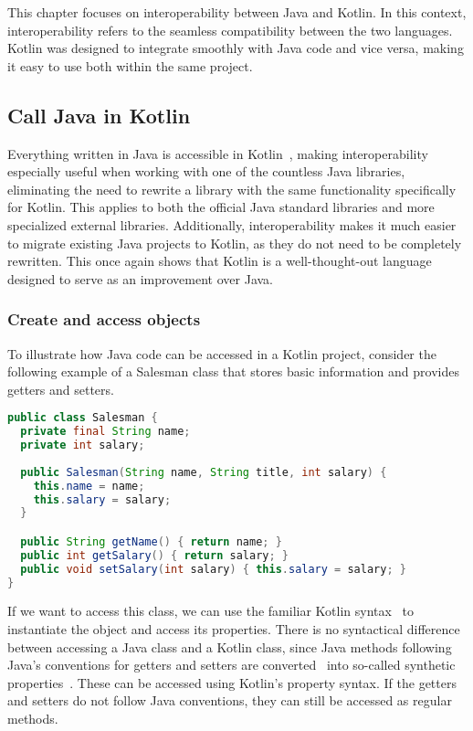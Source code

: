 \documentclass[a4paper,11pt]{article}
\begin{document}
This chapter focuses on interoperability between Java and Kotlin. In this context, interoperability refers to the seamless compatibility between the two languages. Kotlin was designed to integrate smoothly with Java code and vice versa, making it easy to use both within the same project.

\subsection{Call Java in Kotlin}
Everything written in Java is accessible in Kotlin~\cite{interop}, making interoperability especially useful when working with one of the countless Java libraries, eliminating the need to rewrite a library with the same functionality specifically for Kotlin. This applies to both the official Java standard libraries and more specialized external libraries. Additionally, interoperability makes it much easier to migrate existing Java projects to Kotlin, as they do not need to be completely rewritten. This once again shows that Kotlin is a well-thought-out language designed to serve as an improvement over Java.

\subsubsection{Create and access objects}
To illustrate how Java code can be accessed in a Kotlin project, consider the following example of a Salesman class that stores basic information and provides getters and setters.
\begin{lstlisting}[language=Java,title={Example Java class}]
public class Salesman {
  private final String name;
  private int salary;
  
  public Salesman(String name, String title, int salary) {
    this.name = name;
    this.salary = salary;
  }

  public String getName() { return name; }
  public int getSalary() { return salary; }
  public void setSalary(int salary) { this.salary = salary; }
}
\end{lstlisting}

If we want to access this class, we can use the familiar Kotlin syntax~\cite{interop} to instantiate the object and access its properties. There is no syntactical difference between accessing a Java class and a Kotlin class, since Java methods following Java's conventions for getters and setters are converted~\cite{interop-getter-setter} into so-called synthetic properties~\cite{interop-synthetic-property}. These can be accessed using Kotlin’s property syntax. If the getters and setters do not follow Java conventions, they can still be accessed as regular methods.
\end{document}
